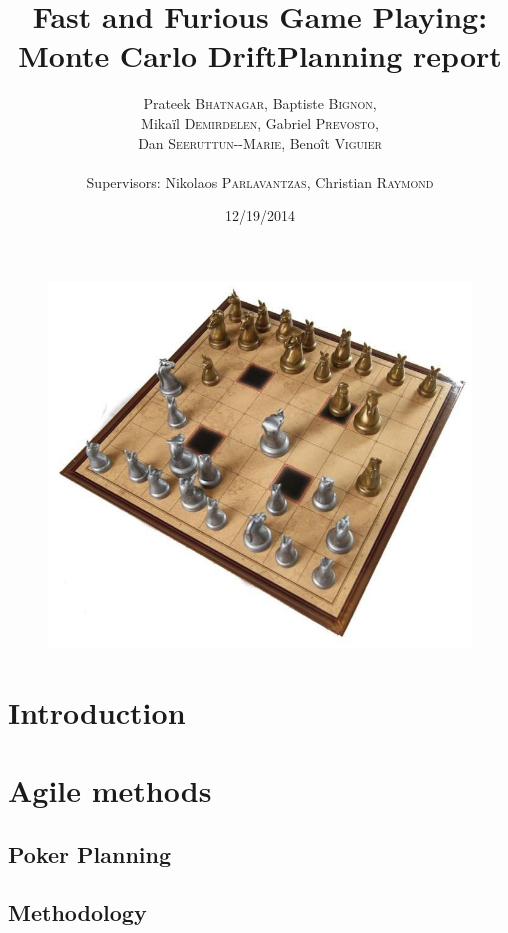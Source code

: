 \documentclass[12pt]{article}
\title{Fast and Furious Game Playing: Monte Carlo Drift\smallbreak Planning report} %
\author{Prateek \textsc{Bhatnagar}, Baptiste \textsc{Bignon}, \\
        Mikaïl \textsc{Demirdelen}, Gabriel \textsc{Prevosto}, \\
        Dan \textsc{Seeruttun-{}-Marie}, Benoît \textsc{Viguier} \\
        \\
        Supervisors: Nikolaos \textsc{Parlavantzas}, Christian \textsc{Raymond}}
\date{12/19/2014}
\begin{document}
\maketitle

\begin{figure}[!h] 
\centerline{\includegraphics[scale=0.50]{Pictures/arimaa}}
\end{figure}
\newpage

\tableofcontents
\newpage


\section{Introduction}					\label{sec:introduction} 		
\newpage

\section{Agile methods}				\label{sec:AgileMethod}
	\subsection{Poker Planning}		\label{sec:PokerPlanning}		
	\subsection{Methodology}		\label{sec:Method}		
\end{document}
